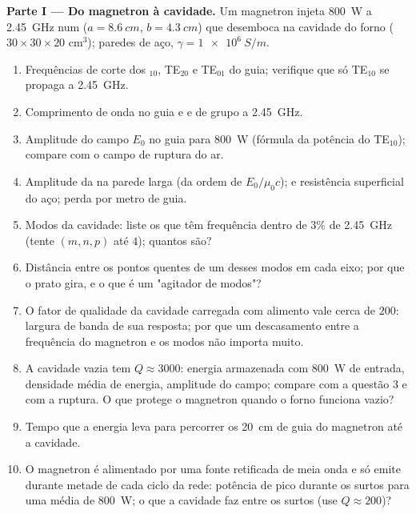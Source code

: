 \begin{problem}
\label{pb:b2:guided-waves:1}

\medskip
\noindent\textbf{Parte I --- Do magnetron à cavidade.}
Um magnetron injeta \qty{800}{W} a \qty{2.45}{GHz} num  ($a = \qty{8.6}{cm}$, $b = \qty{4.3}{cm}$) que desemboca na cavidade
do forno ($30 \times 30 \times 20$ cm$^3$); paredes de aço, $\gamma = \qty{1e6}{S/m}$.
\begin{enumerate}
  \item Frequências de corte dos $_{10}$, TE$_{20}$ e TE$_{01}$ do guia;
        verifique que só TE$_{10}$ se propaga a \qty{2.45}{GHz}.
  \item Comprimento de onda no guia e  e de grupo a \qty{2.45}{GHz}.
  \item Amplitude do campo $E_0$ no guia para \qty{800}{W} (fórmula da potência
        do TE$_{10}$); compare com o campo de ruptura do ar.
  \item Amplitude da  na parede larga (da ordem de
        $E_0/\mu_0c$);  e resistência superficial do aço;
        perda por metro de guia.
  \item Modos da cavidade: liste os que têm frequência dentro de $3\%$
        de \qty{2.45}{GHz} (tente $(m, n, p)$ até $4$); quantos são?
  \item Distância entre os pontos quentes de um desses modos em cada
        eixo; por que o prato gira, e o que é um "agitador de modos"?
  \item O fator de qualidade da cavidade carregada com alimento vale cerca de
        $200$: largura de banda de sua resposta; por que um descasamento entre a
        frequência do magnetron e os modos não importa muito.
  \item A cavidade vazia tem $Q \approx 3000$: energia armazenada com \qty{800}{W}
        de entrada, densidade média de energia, amplitude do campo; compare com a
        questão 3 e com a ruptura. O que protege o magnetron
        quando o forno funciona vazio?
  \item Tempo que a energia leva para percorrer os \qty{20}{cm} de guia do
        magnetron até a cavidade.
  \item O magnetron é alimentado por uma fonte retificada de meia onda e só emite
        durante metade de cada ciclo da rede: potência de pico durante os
        surtos para uma média de \qty{800}{W}; o que a cavidade faz
        entre os surtos (use $Q \approx 200$)?
\end{enumerate}


\end{problem}
